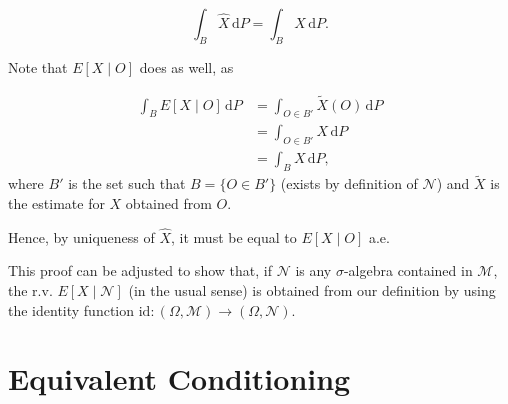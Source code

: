 \documentclass{article}
\newcommand{\M}{\mathcal{M}}
\newcommand{\N}{\mathcal{N}}
\newcommand{\dd}{\,\mathrm{d}}
\newcommand{\id}{\mathrm{id}}
\begin{document}
	\[\int_B \hat X \dd P = \int_B X \dd P.\]
	
	Note that $E[X \mid O]$ does as well, as
	
	\begin{align*}
	\int_B E[X \mid O] \dd P &= \int_{O \in B'} \tilde X(O) \dd P\\
	&= \int_{O \in B'} X \dd P\\
	&= \int_B X \dd P,
	\end{align*}
	where $B'$ is the set such that $B = \{O \in B'\}$ (exists by definition of $\N$) and $\tilde X$ is the estimate for $X$ obtained from $O$.
	
	Hence, by uniqueness of $\hat X$, it must be equal to $E[X \mid O]$ a.e.
	
	\smallskip
	
	This proof can be adjusted to show that, if $\N$ is any $\sigma$-algebra contained in $\M$, the r.v. $E[X \mid \N]$ (in the usual sense) is obtained from our definition by using the identity function $\id : (\Omega, \M) \to (\Omega, \N)$.
	
	\section{Equivalent Conditioning}
	
	
\end{document}
